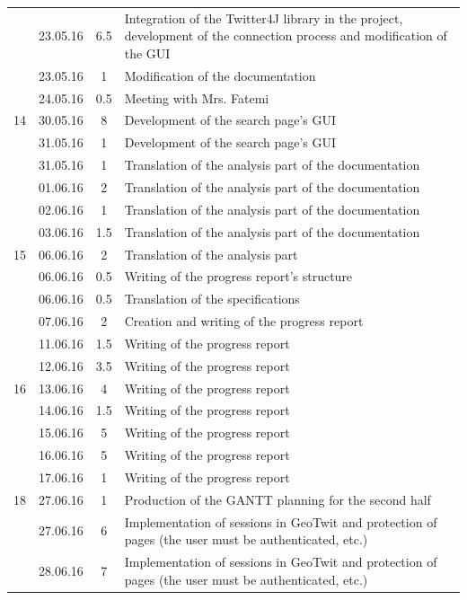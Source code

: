 \documentclass[a4paper,11pt]{report}
\begin{document}
\begin{center}
\begin{longtable}{c|l|c|p{10cm}}
     & 23.05.16 & 6.5 & Integration of the Twitter4J library in the project, development of the connection process and modification of the GUI\\
     & 23.05.16 & 1 & Modification of the documentation\\
     & 24.05.16 & 0.5 & Meeting with Mrs. Fatemi\\\hline
    14 & 30.05.16 & 8 & Development of the search page's GUI\\
     & 31.05.16 & 1 & Development of the search page's GUI\\
     & 31.05.16 & 1 & Translation of the analysis part of the documentation\\
     & 01.06.16 & 2 & Translation of the analysis part of the documentation\\
     & 02.06.16 & 1 & Translation of the analysis part of the documentation\\
     & 03.06.16 & 1.5 & Translation of the analysis part of the documentation\\\hline
    15 & 06.06.16 & 2 & Translation of the analysis part\\
     & 06.06.16 & 0.5 & Writing of the progress report's structure\\
     & 06.06.16 & 0.5 & Translation of the specifications\\
     & 07.06.16 & 2 & Creation and writing of the progress report\\
     & 11.06.16 & 1.5 & Writing of the progress report\\
     & 12.06.16 & 3.5 & Writing of the progress report\\\hline
    16 & 13.06.16 & 4 & Writing of the progress report\\
     & 14.06.16 & 1.5 & Writing of the progress report\\
     & 15.06.16 & 5 & Writing of the progress report\\
     & 16.06.16 & 5 & Writing of the progress report\\
     & 17.06.16 & 1 & Writing of the progress report\\\hline
    18 & 27.06.16 & 1 & Production of the GANTT planning for the second half\\
     & 27.06.16 & 6 & Implementation of sessions in GeoTwit and protection of pages (the user must be authenticated, etc.)\\
     & 28.06.16 & 7 & Implementation of sessions in GeoTwit and protection of pages (the user must be authenticated, etc.)\\

\end{longtable}
\end{center}
\end{document}
